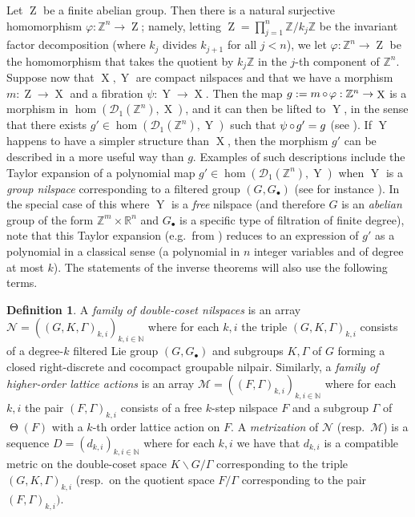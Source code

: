 \documentclass[a4paper,12pt,reqno]{amsart}
\theoremstyle{definition}
\newtheorem{defn}[theorem]{Definition}
\def\to{\rightarrow}
\newcommand{\mc}{\mathcal}
\newcommand{\mb}{\mathbb}
\DeclareMathOperator{\ab}{Z}
\DeclareMathOperator{\tran}{\Theta}
\DeclareMathOperator{\ns}{X}
\DeclareMathOperator{\nss}{Y}
\DeclareMathOperator{\co}{\circ\hspace{-0.02 cm}}
\begin{document}
Let $\ab$ be a finite abelian group. Then there is a natural surjective homomorphism $\varphi:\mb{Z}^n\to \ab$; namely, letting $\ab=\prod_{j=1}^n\mb{Z}/k_j\mb{Z}$ be the invariant factor decomposition (where $k_j$ divides $k_{j+1}$ for all $j<n$), we let $\varphi:\mb{Z}^n\to \ab$ be the homomorphism that takes the quotient by $k_j\mb{Z}$ in the $j$-th component of $\mb{Z}^n$. Suppose now that $\ns,\nss$ are compact nilspaces and that we have a morphism $m:\ab\to \ns$ and a fibration $\psi:\nss \to \ns$. Then the map $g:=m\co\varphi:\mb{Z}^n\to \ns$ is a morphism in $\hom(\mc{D}_1(\mb{Z}^n),\ns)$, and it can then be lifted to $\nss$, in the sense that there exists $g'\in \hom(\mc{D}_1(\mb{Z}^n),\nss)$ such that $\psi\co g' = g$ (see \cite[Corollary A.7]{CGSS-p-hom}). If $\nss$ happens to have a simpler structure than $\ns$, then the morphism $g'$ can be described in a  more useful way than $g$. Examples of such descriptions include the Taylor expansion of a polynomial map $g'\in\hom(\mc{D}_1(\mb{Z}^n),\nss)$ when $\nss$ is a \emph{group nilspace} corresponding to a filtered group $(G,G_\bullet)$ (see for instance \cite[Lemma B.9]{GTZ}). In the special case of this where $\nss$ is a \emph{free} nilspace (and therefore $G$ is an \emph{abelian} group of the form $\mb{Z}^m\times \mb{R}^n$ and $G_\bullet$ is a specific type of filtration of finite degree), note that this Taylor expansion (e.g.\ from \cite[Lemma B.9]{GTZ}) reduces to an expression of $g'$ as a polynomial in a classical sense (a polynomial in $n$ integer variables and of degree at most $k$).
The statements of the inverse theorems will also use the following terms.
\begin{defn}
A \emph{family of double-coset nilspaces} is an array $\mc{N}=((G,K,\Gamma)_{k,i})_{k,i\in\mb{N}}$ where for each $k,i$ the triple $ (G,K,\Gamma)_{k,i}$ consists of a degree-$k$ filtered Lie group $(G,G_\bullet)$ and subgroups $K,\Gamma$ of $G$ forming a closed right-discrete and cocompact groupable nilpair.  Similarly, a \emph{family of higher-order lattice actions} is an array $\mc{M}=((F,\Gamma)_{k,i})_{k,i\in\mb{N}}$ where for each $k,i$ the pair $ (F,\Gamma)_{k,i}$ consists of a free $k$-step nilspace $F$ and a subgroup $\Gamma$ of $\tran(F)$ with a $k$-th order lattice action on $F$. A \emph{metrization} of $\mc{N}$ (resp.\ $\mc{M}$) is a sequence $D=(d_{k,i})_{k,i\in\mb{N}}$ where for each $k,i$ we have that $d_{k,i}$ is a compatible metric on the double-coset space $K\backslash G /\Gamma$ corresponding to the triple $(G,K,\Gamma)_{k,i}$ (resp.\ on the quotient space $F/\Gamma$ corresponding to the pair $(F,\Gamma)_{k,i})$.
\end{defn}
\end{document}

